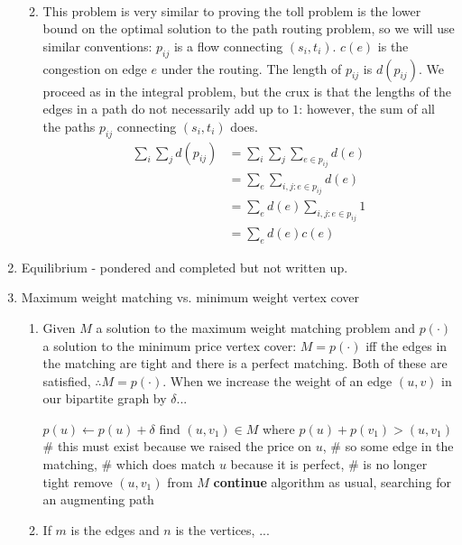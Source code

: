 \documentclass[a4paper]{article}
\begin{document}
\begin{enumerate}
\begin{enumerate}
\\
	\item This problem is very similar to proving the toll problem is the lower bound on the optimal solution to the path routing problem, so we will use similar conventions: $p_{ij}$ is a flow connecting $(s_i, t_i)$.  $c(e)$ is the congestion on edge $e$ under the routing.  The length of $p_{ij}$ is $d(p_{ij})$.  We proceed as in the integral problem, but the crux is that the lengths of the edges in a path do not necessarily add up to $1$: however, the sum of all the paths $p_{ij}$ connecting $(s_i, t_i)$ does.
		\begin{align*}
			\sum_{i}^{} \sum_{j}^{} d(p_{ij}) &= \sum_{i}^{} \sum_{j}^{} \sum_{e \in p_{ij}}^{} d(e) \\
			&= \sum_{e}^{} \sum_{i,j:e \in p_{ij}}^{} d(e) \\
			&= \sum_{e}^{} d(e) \sum_{i,j:e \in p_{ij}}^{} 1 \\
			&= \sum_{e}^{} d(e)c(e)
		\end{align*}
	\end{enumerate}
\item Equilibrium - pondered and completed but not written up.
\item Maximum weight matching vs. minimum weight vertex cover
	\begin{enumerate}
	\item Given $M$ a solution to the maximum weight matching problem and $p(\cdot)$ a solution to the minimum price vertex cover: $M=p(\cdot)$ iff the edges in the matching are tight and there is a perfect matching.  Both of these are satisfied, $\therefore M=p(\cdot)$.  When we increase the weight of an edge $(u,v)$ in our bipartite graph by $\delta$...
	\begin{algorithmic}
	\State $p(u) \gets p(u) + \delta$
		\Return
	\Else
		\State find $(u, v_1) \in M$ where $p(u) + p(v_1) > (u, v_1)$
		\State \# this must exist because we raised the price on $u$,
		\State \# so some edge in the matching,
		\State \# which does match $u$ because it is perfect,
		\State \# is no longer tight
		\State remove $(u, v_1)$ from $M$
		\State \textbf{continue} algorithm as usual, searching for an augmenting path
	\EndIf
	\end{algorithmic}
	\item If $m$ is the edges and $n$ is the vertices, ...
	\end{enumerate}
\end{enumerate}
\end{document}

